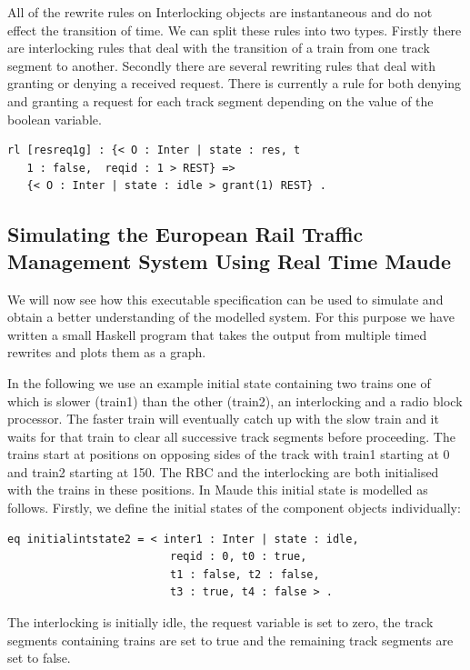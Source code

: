 All of the rewrite rules on Interlocking objects are instantaneous and do not effect the transition of time.  We can split these rules into two types. Firstly there are interlocking rules that deal with the transition of a train from one track segment to another. Secondly there are several rewriting rules that deal with granting or denying a received request. There is currently a rule for both denying and granting a request for each track segment depending on the value of the boolean variable.

\begin{lstlisting}[caption = The interlocking transition which grants a track segment request]
rl [resreq1g] : {< O : Inter | state : res, t
   1 : false,  reqid : 1 > REST} => 
   {< O : Inter | state : idle > grant(1) REST} .
\end{lstlisting}

\subsection{Simulating the European Rail Traffic Management System Using Real Time Maude}
We will now see how this executable specification can be used to simulate and obtain a better understanding of the modelled system. For this purpose we have written a small Haskell program that takes the output from multiple timed rewrites and plots them as a graph.

In the following we use an example initial state containing two trains one of which is slower (train1) than the other (train2), an interlocking and a radio block processor. The faster train will eventually catch up with the slow train and it waits for that train to clear all successive track segments before proceeding. The trains start at positions on opposing sides of the track with train1 starting at 0 and train2 starting at 150. The RBC and the interlocking are both initialised with the trains in these positions. In Maude this initial state is modelled as follows. Firstly, we define the initial states of the component objects individually:

\begin{lstlisting}[caption = The initial interlocking state in Maude]
 eq initialintstate2 = < inter1 : Inter | state : idle, 
                         reqid : 0, t0 : true, 
                         t1 : false, t2 : false, 
                         t3 : true, t4 : false > .
\end{lstlisting}

The  interlocking is initially idle, the request variable is set to zero, the track segments containing trains are set to true and the remaining track segments are set to false.

